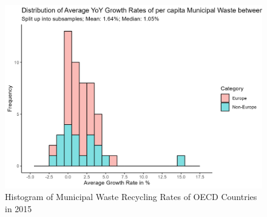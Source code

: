 \documentclass[12pt,a4paper]{article}
\begin{document}
\begin{figure}[h]
\centering
\includegraphics[scale=0.65]{../04_figures/hist_growthrates.png}
\caption{Histogram of Municipal Waste Recycling Rates of OECD Countries in 2015}
\label{fig:histgrowthrates}
\end{figure}


\pagebreak
{}
\setcounter{page}{\thesavepage}
\pagestyle{plain}
%
%
\printbibliography[]
\clearpage
\appendix
\end{document}
